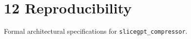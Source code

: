 \section{12 Reproducibility}

Formal architectural specifications for \texttt{slicegpt_compressor}.

